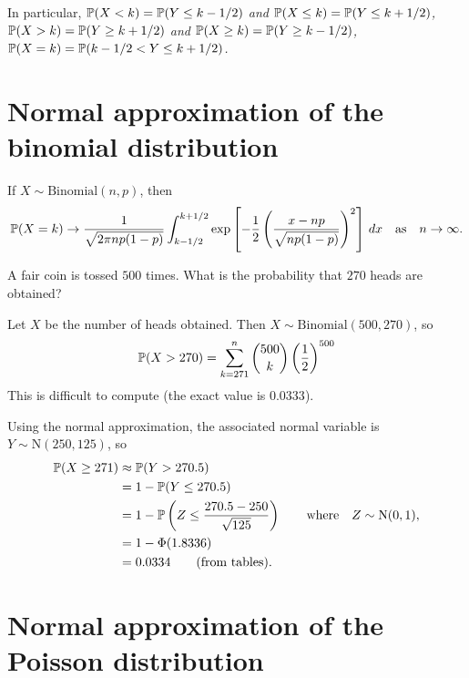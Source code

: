 In particular,
\bit
\it $\mathbb{P}(X < k) = \mathbb{P}(Y\leq k-1/2)$ and $\mathbb{P}(X\leq k) = \mathbb{P}(Y\leq k+1/2)$,
\it $\mathbb{P}(X > k) = \mathbb{P}(Y\geq k+1/2)$ and $\mathbb{P}(X\geq k) = \mathbb{P}(Y\geq k-1/2)$,
\it $\mathbb{P}(X = k) = \mathbb{P}(k-1/2 < Y \leq k+1/2)$.
\eit

\section{Normal approximation of the binomial distribution}

\begin{theorem}
If $X\sim\text{Binomial}(n,p)$, then
\[
\mathbb{P}(X=k)\to \frac{1}{\sqrt{2\pi np(1-p)}}\int_{k-1/2}^{k+1/2} \exp\left[-\frac{1}{2}\left(\frac{x-np}{\sqrt{np(1-p)}}\right)^2\right]\,dx 
\quad\text{as}\quad n\to\infty.
\]
\end{theorem}
\proofomitted

\begin{example}
A fair coin is tossed $500$ times. What is the probability that $270$ heads are obtained?
\end{example}

\begin{solution}
Let $X$ be the number of heads obtained. Then $X\sim\text{Binomial}(500,270)$, so 
\[
\mathbb{P}(X > 270) = \sum_{k=271}^{n}\binom{500}{k}\left(\frac{1}{2}\right)^{500}
\]
This is difficult to compute (the exact value is $0.0333$).

Using the normal approximation, the associated normal variable is $Y\sim\text{N}(250,125)$, so
\begin{align*}
\mathbb{P}(X\geq 271)
	& \approx\mathbb{P}(Y > 270.5) \\
	& = 1 - \mathbb{P}(Y \leq 270.5) \\
	& = 1 - \mathbb{P}\left(Z \leq \frac{270.5 - 250}{\sqrt{125}}\right) \qquad\text{where}\quad Z\sim\text{N}(0,1), \\
	& = 1 - \Phi(1.8336) \\
	& = 0.0334 \qquad\text{(from tables)}.
\end{align*}
\end{solution}


\section{Normal approximation of the Poisson distribution}


